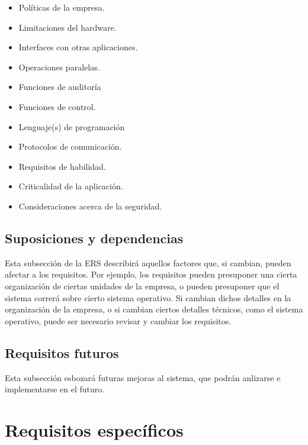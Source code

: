 \documentclass[12pt,a4paper, twosite]{article}
\begin{document}
\begin{itemize}
\item Políticas de la empresa.

\item Limitaciones del hardware.

\item Interfaces con otras aplicaciones.

\item Operaciones paralelas.

\item Funciones de auditoría

\item Funciones de control.

\item Lenguaje(s) de programación

\item Protocolos de comunicación.

\item Requisitos de habilidad.

\item Criticalidad de la aplicación.

\item Consideraciones acerca de la seguridad.
\end{itemize}


\subsection{Suposiciones y dependencias}
\label{sec:org0ae23fe}

Esta subsección de la ERS describirá aquellos factores que, si
cambian, pueden afectar a los requisitos. Por ejemplo, los
requisitos pueden presuponer una cierta organización de ciertas
unidades de la empresa, o pueden presuponer que  el sistema correrá
sobre cierto sistema operativo. Si cambian dichos detalles en la
organización de la empresa, o si cambian ciertos detalles técnicos,
como el sistema operativo, puede ser necesario revisar y cambiar los
requisitos. 


\subsection{Requisitos futuros}
\label{sec:org33cfcdb}

Esta subsección esbozará futuras mejoras al sistema, que podrán
anlizarse e implementarse en el futuro.   


\section{Requisitos específicos}
\label{sec:org40573d1}
\end{document}
